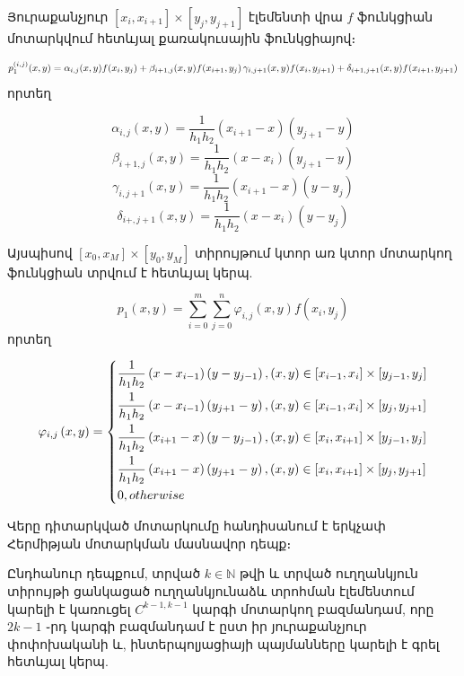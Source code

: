 \documentclass[fleqn, bachelor,subf,12pt,notitlepage]{disser}
\newcommand\scalemath[2]{\scalebox{#1}{\mbox{\ensuremath{\displaystyle #2}}}}
\begin{document}
Յուրաքանչյուր  $\left[x_{i}, x_{i+1}\right] \times \left[y_{j}, y_{j+1}\right]$ էլեմենտի վրա $f$ ֆունկցիան մոտարկվում հետևյալ քառակուսային ֆունկցիայով։

$$\scalemath{0.9}{p_{1}^{(i, j)}(x, y)=\alpha_{i,j}(x,y)f(x_{i},y_{j})+\beta_{i+1,j}(x,y)f(x_{i+1},y_{j})\scalemath{0.2}+\gamma_{i,j+1}(x,y) f(x_{i},y_{j+1})+\delta_{i+1, j+1}(x,y)f(x_{i+1},y_{j+1})}$$
 որտեղ 

$$\alpha_{i,j}(x,y)=\dfrac{1}{h_{1}h_{2}}\left(x_{i+1}-x\right)\left(y_{j+1}-y\right)$$
$$\beta_{i+1,j}(x,y)=\dfrac{1}{h_{1}h_{2}}\left(x-x_{i}\right)\left(y_{j+1}-y\right)$$
$$\gamma_{i,j+1}(x,y)=\dfrac{1}{h_{1}h_{2}}\left(x_{i+1}-x\right)\left(y-y_{j}\right)$$
$$\delta_{i+,j+1}(x,y)=\dfrac{1}{h_{1}h_{2}}\left(x-x_{i}\right)\left(y-y_{j}\right)$$

Այսպիսով $\left[x_{0}, x_{M}\right] \times \left[y_{0}, y_{M}\right]$ տիրույթում կտոր առ կտոր մոտարկող ֆունկցիան տրվում է հետևյալ կերպ.

$$p_{1}(x,y)=\sum_{i=0}^{m}\sum_{j=0}^{n}\varphi_{i,j}(x,y)f(x_{i},y_{j})$$
որտեղ


$$\varphi_{i,j}\left(x, y\right)=\begin{dcases}
\dfrac{1}{h_{1}h_{2}}\left(x-x_{i-1}\right)\left(y-y_{j-1}\right), (x,y)\in \left[x_{i-1}, x_{i}\right]\times\left[y_{j-1}, y_{j}\right]\\
\dfrac{1}{h_{1}h_{2}}\left(x-x_{i-1}\right)\left(y_{j+1}-y\right), (x,y)\in \left[x_{i-1}, x_{i}\right]\times\left[y_{j}, y_{j+1}\right]\\
\dfrac{1}{h_{1}h_{2}}\left(x_{i+1}-x\right)\left(y-y_{j-1}\right), (x,y)\in \left[x_{i}, x_{i+1}\right]\times\left[y_{j-1}, y_{j}\right]\\
\dfrac{1}{h_{1}h_{2}}\left(x_{i+1}-x\right)\left(y_{j+1}-y\right), (x,y)\in \left[x_{i}, x_{i+1}\right]\times\left[y_{j}, y_{j+1}\right]\\
0, otherwise\\
\end{dcases}$$

Վերը դիտարկված մոտարկումը հանդիսանում է երկչափ Հերմիթյան մոտարկման մասնավոր դեպք։

Ընդհանուր դեպքում, տրված $k\in \mathbb{N}$ թվի և տրված ուղղանկյուն տիրույթի ցանկացած ուղղանկյունաձև տրոհման էլեմենտում կարելի է կառուցել $C^{k-1, k-1}$ կարգի մոտարկող բազմանդամ, որը $2k-1$ ֊րդ կարգի բազմանդամ է ըստ իր յուրաքանչյուր փոփոխականի և, ինտերպոլյացիայի պայմանները կարելի է գրել հետևյալ կերպ.
\end{document}
